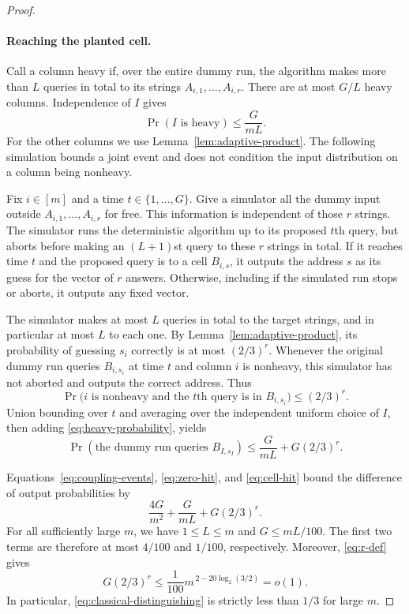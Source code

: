\begin{proof}
\paragraph{Reaching the planted cell.}
Call a column heavy if, over the entire dummy run, the algorithm makes
more than $L$ queries in total to its strings $A_{i,1},\ldots,A_{i,r}$.
There are at most $G/L$ heavy columns.  Independence of $I$ gives
\begin{equation}\label{eq:heavy-probability}
 \Pr(I\text{ is heavy})\leq\frac{G}{mL}.
\end{equation}
For the other columns we use Lemma~\ref{lem:adaptive-product}.  The
following simulation bounds a joint event and does not condition the
input distribution on a column being nonheavy.

Fix $i\in[m]$ and a time $t\in\{1,\ldots,G\}$.  Give a simulator all
the dummy input outside $A_{i,1},\ldots,A_{i,r}$ for free.  This
information is independent of those $r$ strings.  The simulator runs
the deterministic algorithm up to its proposed $t$th query, but aborts
before making an $(L+1)$st query to these $r$ strings in total.  If it
reaches time $t$ and the proposed query is to a cell $B_{i,s}$, it outputs
the address $s$ as its guess for the vector of $r$ answers.  Otherwise,
including if the simulated run stops or aborts, it outputs any fixed
vector.

The simulator makes at most $L$ queries in total to the target strings,
and in particular at most $L$ to each one.  By
Lemma~\ref{lem:adaptive-product}, its probability of guessing $s_i$
correctly is at most $(2/3)^r$.  Whenever the original dummy run queries
$B_{i,s_i}$ at time $t$ and column $i$ is nonheavy, this simulator has
not aborted and outputs the correct address.  Thus
\begin{equation}\label{eq:capped-address}
 \Pr\bigl(i\text{ is nonheavy and the $t$th query is in }B_{i,s_i}\bigr)
 \leq (2/3)^r.
\end{equation}
Union bounding over $t$ and averaging over the independent uniform
choice of $I$, then adding \eqref{eq:heavy-probability}, yields
\begin{equation}\label{eq:cell-hit}
 \Pr(\text{the dummy run queries }B_{I,s_I})
 \leq\frac{G}{mL}+G(2/3)^r.
\end{equation}

Equations~\eqref{eq:coupling-events}, \eqref{eq:zero-hit}, and
\eqref{eq:cell-hit} bound the difference of output probabilities by
\begin{equation}\label{eq:classical-distinguishing}
 \frac{4G}{m^2}+\frac{G}{mL}+G(2/3)^r.
\end{equation}
For all sufficiently large $m$, we have $1\leq L\leq m$ and
$G\leq mL/100$.  The first two terms are therefore at most $4/100$
and $1/100$, respectively.  Moreover, \eqref{eq:r-def} gives
\[
 G(2/3)^r
 \leq\frac1{100}m^{\,2-20\log_2(3/2)}=o(1).
\]
In particular, \eqref{eq:classical-distinguishing} is strictly less
than $1/3$ for large $m$.


\end{proof}
